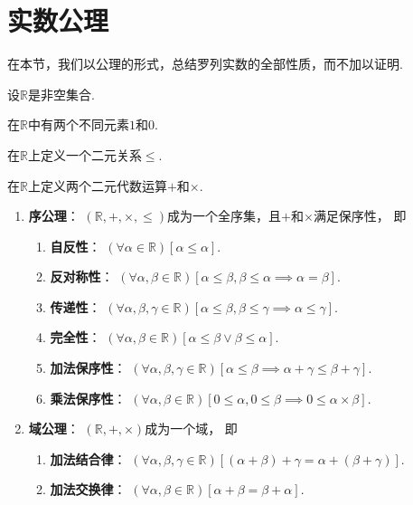 \section{实数公理}
在本节，我们以公理的形式，总结罗列实数的全部性质，而不加以证明.
\begin{axiom}
设\(\mathbb{R}\)是非空集合.

在\(\mathbb{R}\)中有两个不同元素\(1\)和\(0\).

在\(\mathbb{R}\)上定义一个二元关系\(\leq\).

在\(\mathbb{R}\)上定义两个二元代数运算\(+\)和\(\times\).

\begin{enumerate}
	\item {\bf 序公理}：
	\((\mathbb{R},+,\times,\leq)\)成为一个全序集，且\(+\)和\(\times\)满足保序性，
	即\begin{enumerate}
		\item {\bf 自反性}：
		\((\forall\alpha\in\mathbb{R})
		[\alpha\leq\alpha]\).

		\item {\bf 反对称性}：
		\((\forall\alpha,\beta\in\mathbb{R})
		[\alpha\leq\beta,\beta\leq\alpha\implies\alpha=\beta]\).

		\item {\bf 传递性}：
		\((\forall\alpha,\beta,\gamma\in\mathbb{R})
		[\alpha\leq\beta,\beta\leq\gamma\implies\alpha\leq\gamma]\).

		\item {\bf 完全性}：
		\((\forall\alpha,\beta\in\mathbb{R})
		[\alpha\leq\beta\lor\beta\leq\alpha]\).

		\item {\bf 加法保序性}：
		\((\forall\alpha,\beta,\gamma\in\mathbb{R})
		[\alpha\leq\beta\implies\alpha+\gamma\leq\beta+\gamma]\).

		\item {\bf 乘法保序性}：
		\((\forall\alpha,\beta\in\mathbb{R})
		[0\leq\alpha,0\leq\beta\implies0\leq\alpha\times\beta]\).
	\end{enumerate}

	\item {\bf 域公理}：
	\((\mathbb{R},+,\times)\)成为一个域，
	即\begin{enumerate}
		\item {\bf 加法结合律}：
		\((\forall\alpha,\beta,\gamma\in\mathbb{R})
		[(\alpha+\beta)+\gamma=\alpha+(\beta+\gamma)]\).

		\item {\bf 加法交换律}：
		\((\forall\alpha,\beta\in\mathbb{R})
		[\alpha+\beta=\beta+\alpha]\).


\end{enumerate}
\end{enumerate}
\end{axiom}
